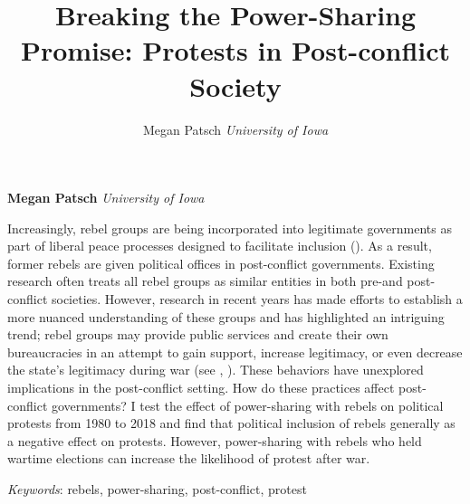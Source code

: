 \documentclass[11pt,]{article}
\title{Breaking the Power-Sharing Promise: Protests in Post-conflict Society }
\author{\Large Megan Patsch\vspace{0.05in} \newline\normalsize\emph{University of Iowa}  }
\date{}
\newcommand*{\authorfont}{\fontfamily{phv}\selectfont}
\renewenvironment{abstract}
 {{%
    \setlength{\leftmargin}{0mm}
    \setlength{\rightmargin}{\leftmargin}%
  }%
  \relax}
 {\endlist}
\begin{document}
	
%

{%
\setlength{\parindent}{0pt}
\thispagestyle{plain}
{\fontsize{18}{20}\selectfont\raggedright 
\maketitle  %

}

{
   \vskip 13.5pt\relax \normalsize\fontsize{11}{12} 
\textbf{\authorfont Megan Patsch} \hskip 15pt \emph{\small University of Iowa}   

}

}








\begin{abstract}

    \hbox{\vrule height .2pt width 39.14pc}

    \vskip 8.5pt %

\noindent Increasingly, rebel groups are being incorporated into legitimate
governments as part of liberal peace processes designed to facilitate
inclusion (\citet{hartzell_institutionalizing_2008}). As a result,
former rebels are given political offices in post-conflict governments.
Existing research often treats all rebel groups as similar entities in
both pre-and post-conflict societies. However, research in recent years
has made efforts to establish a more nuanced understanding of these
groups and has highlighted an intriguing trend; rebel groups may provide
public services and create their own bureaucracies in an attempt to gain
support, increase legitimacy, or even decrease the state's legitimacy
during war (see \citet{stewart_civil_2018},
\citet{terpstra_rebel_2017}). These behaviors have unexplored
implications in the post-conflict setting. How do these practices affect
post-conflict governments? I test the effect of power-sharing with
rebels on political protests from 1980 to 2018 and find that political
inclusion of rebels generally as a negative effect on protests. However,
power-sharing with rebels who held wartime elections can increase the
likelihood of protest after war.


\vskip 8.5pt \noindent \emph{Keywords}: rebels, power-sharing, post-conflict, protest \par

    \hbox{\vrule height .2pt width 39.14pc}



\end{abstract}
\end{document}
